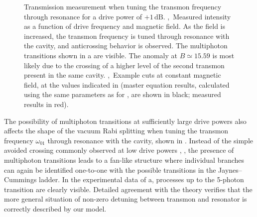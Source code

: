 \begin{figure}
 \centering
\caption[Qubit--cavity avoided crossing at high drive power]
 { Transmission measurement when tuning the transmon frequency through resonance for a drive power of $+1\,\text{dB}$. ,~Measured intensity as a function of drive frequency and magnetic field. As the field is increased, the transmon frequency is tuned through resonance with the cavity, and anticrossing behavior is observed. The multiphoton transitions shown in a are visible. The anomaly at $B\simeq 15.59$ is most likely due to the crossing of a higher level of the second transmon present in the same cavity. ,~Example cuts at constant magnetic field, at the values indicated in  (master equation results, calculated using the same parameters as for , are shown in black; measured results in red).\label{fig:wolverine}}
 \end{figure}%
The possibility of multiphoton transitions at sufficiently large drive powers also affects the shape of the vacuum Rabi splitting when tuning the transmon frequency $\omega_{01}$ through resonance with the cavity, shown in . Instead of the simple avoided crossing commonly observed at low drive powers \cite{wallra_strong_2004}, , the presence of multiphoton transitions leads to a fan-like structure where individual branches can again be identified one-to-one with the possible transitions in the Jaynes--Cummings ladder. In the experimental data of a, processes up to the 5-photon transition are clearly visible. Detailed agreement with the theory verifies that the more general situation of non-zero detuning between transmon and resonator is correctly described by our model.

